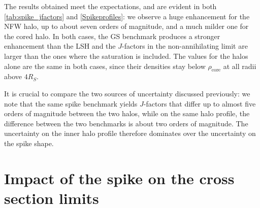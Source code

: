 The results obtained meet the expectations, and are evident in both
\cref{tab:spike_jfactors} and \cref{Spikeprofiles}: we observe a huge enhancement for
the NFW halo, up to about seven orders of magnitude, and a much milder one for the
cored halo.
In both cases, the GS benchmark produces a stronger enhancement than the LSH and the $J$-factors in the non-annihilating limit are larger than the ones where the saturation is included.
The values for the halos alone are the same in both cases, since their densities
stay below $\rho_{\mathrm{core}}$ at all radii above $4R_S$.

It is crucial to compare the two sources of uncertainty discussed previously: we note that the same spike benchmark yields $J$-factors that differ up to almost five orders of magnitude between the two halos,
while on the same halo profile, the difference between the two benchmarks is about two orders of magnitude.
The uncertainty on the inner halo profile therefore dominates over the
uncertainty on the spike shape.






\section{Impact of the spike on the cross section limits} \label{sec:spike_limits}



